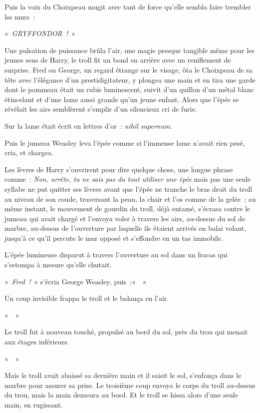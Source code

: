 Puis la voix du Choixpeau mugit avec tant de force qu'elle sembla faire trembler les murs~:

«~\emph{GRYFFONDOR~!}~»

Une pulsation de puissance brûla l'air, une magie presque tangible même pour les jeunes sens de Harry, le troll fit un bond en arrière avec un reniflement de surprise.
Fred ou George, un regard étrange sur le visage, ôta le Choixpeau de sa tête avec l'élégance d'un prestidigitateur, y plongea une main et en tira une garde dont le pommeau était un rubis luminescent, suivit d'un quillon d'un métal blanc étincelant et d'une lame aussi grande qu'un jeune enfant.
Alors que l'épée se révélait les airs semblèrent s'emplir d'un silencieux cri de furie.

Sur la lame était écrit en lettres d'or~: \emph{nihil supernum}.

Puis le jumeau Weasley leva l'épée comme si l'immense lame n'avait rien pesé, cria, et chargea.

Les lèvres de Harry s'ouvrirent pour dire quelque chose, une longue phrase comme~: \emph{Non, arrête, tu ne sais pas du tout utiliser une épée} mais pas une seule syllabe ne put quitter ses lèvres avant que l'épée ne tranche le bras droit du troll au niveau de son coude, traversant la peau, la chair et l'os comme de la gelée~; au même instant, le mouvement de gourdin du troll, déjà entamé, s'écrasa contre le jumeau qui avait chargé et l'envoya voler à travers les airs, au-dessus du sol de marbre, au-dessus de l'ouverture par laquelle ils étaient arrivés en balai volant, jusqu'à ce qu'il percute le mur opposé et s'effondre en un tas immobile.

L'épée lumineuse disparut à travers l'ouverture au sol dans un fracas qui s'estompa à mesure qu'elle chutait.

«~\emph{Fred~!}~» s'écria George Weasley, puis~:«~~»

Un coup invisible frappa le troll et le balança en l'air.

«~~»

Le troll fut à nouveau touché, propulsé au bord du sol, près du trou qui menait aux étages inférieurs.

«~~»

Mais le troll avait abaissé sa dernière main et il saisit le sol, s'enfonça dans le marbre pour assurer sa prise.
Le troisième coup envoya le corps du troll au-dessus du trou, mais la main demeura au bord.
Et le troll se hissa alors d'une seule main, en rugissant.

